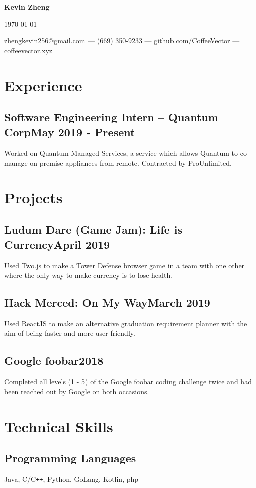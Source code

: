 \documentclass[letterpaper,12pt]{article}
\makeatletter
\newcommand\textbox[1]{%
    \parbox{.333\textwidth}{#1}%
}
\renewcommand{\maketitle}{
    \begin{center}
        \noindent\textbox{\hfill}\textbox{\hfil\bfseries\huge Kevin Zheng\hfil}\textbox{\hfill \today}
        {\faEnvelope \enskip zhengkevin256@gmail.com --- \faPhone \enskip (669) 350-9233 --- \faGithub \enskip \underline{\color{blue}\href{https://github.com/CoffeeVector}{github.com/CoffeeVector}} --- \faChain \enskip \underline{\color{blue}\href{https://coffeevector.xyz}{coffeevector.xyz}}}
    \end{center} }
\makeatother
\begin{document}
\maketitle
\section{Experience}
    \subsection{Software Engineering Intern -- Quantum Corp\null\hfill May 2019 - Present}
    Worked on Quantum Managed Services, a service which allows Quantum to co-manage on-premise appliances from remote.
Contracted by ProUnlimited.
    \vspace*{-2mm}
\section{Projects}
    \subsection{Ludum Dare (Game Jam): Life is Currency\null\hfill April 2019}
    Used Two.js to make a Tower Defense browser game in a team with one other where the only way to make currency is to lose health.
    \vspace*{-2mm}
    \subsection{Hack Merced: On My Way\null\hfill March 2019}
    Used ReactJS to make an alternative graduation requirement planner with the aim of being faster and more user friendly.
    \vspace*{-2mm}
    \subsection{Google foobar\null\hfill 2018}
    Completed all levels (1 - 5) of the Google foobar coding challenge twice and had been reached out by Google on both occasions.
    \vspace*{-2mm}
\section{Technical Skills}
    \subsection{Programming Languages}
    Java, C/C\verb!++!, Python, GoLang, Kotlin, php
    \vspace*{-4mm}
\end{document}
